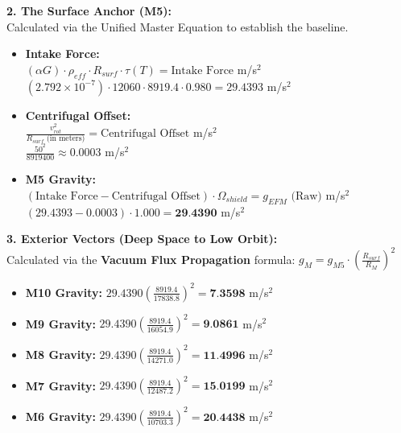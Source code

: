 \documentclass[11pt, a4paper]{article}
\begin{document}
  \vspace{1.0em}
  \noindent \textbf{2. The Surface Anchor (M5):} \\
  \hspace*{1em} Calculated via the Unified Master Equation to establish the baseline.
  \begin{itemize}
    \item \textbf{Intake Force:} \\[0.5em]
    \hspace*{2em} $(\alpha G) \cdot \rho_{eff} \cdot R_{surf} \cdot \tau(T) = \text{Intake Force}$ m/s$^2$ \\[1em]
    \hspace*{2em} $(2.792 \times 10^{-7}) \cdot 12060 \cdot 8919.4 \cdot 0.980 = 29.4393$ m/s$^2$
    
    \item \textbf{Centrifugal Offset:} \\[0.5em]
    \hspace*{2em} $\frac{v_{rot}^2}{R_{surf} \text{ (in meters)}} = \text{Centrifugal Offset}$ m/s$^2$ \\[1em]
    \hspace*{2em} $\frac{50^2}{8919400} \approx 0.0003$ m/s$^2$
    
    \item \textbf{M5 Gravity:} \\[0.5em]
    \hspace*{2em} $(\text{Intake Force} - \text{Centrifugal Offset}) \cdot \Omega_{shield} = g_{EFM} \text{ (Raw)}$ m/s$^2$ \\[1em]
    \hspace*{2em} $(29.4393 - 0.0003) \cdot 1.000 = \textbf{29.4390}$ m/s$^2$
  \end{itemize}

  \clearpage
  \noindent \textbf{3. Exterior Vectors (Deep Space to Low Orbit):} \\
  \hspace*{1em} Calculated via the \textbf{Vacuum Flux Propagation} formula: $g_M = g_{M5} \cdot \left( \frac{R_{surf}}{R_M} \right)^2$
  \begin{itemize}
    \item \textbf{M10 Gravity:} $29.4390 \left( \frac{8919.4}{17838.8} \right)^2 = \textbf{7.3598}$ m/s$^2$
    \item \textbf{M9 Gravity:} $29.4390 \left( \frac{8919.4}{16054.9} \right)^2 = \textbf{9.0861}$ m/s$^2$
    \item \textbf{M8 Gravity:} $29.4390 \left( \frac{8919.4}{14271.0} \right)^2 = \textbf{11.4996}$ m/s$^2$
    \item \textbf{M7 Gravity:} $29.4390 \left( \frac{8919.4}{12487.2} \right)^2 = \textbf{15.0199}$ m/s$^2$
    \item \textbf{M6 Gravity:} $29.4390 \left( \frac{8919.4}{10703.3} \right)^2 = \textbf{20.4438}$ m/s$^2$
  \end{itemize}
\end{document}
